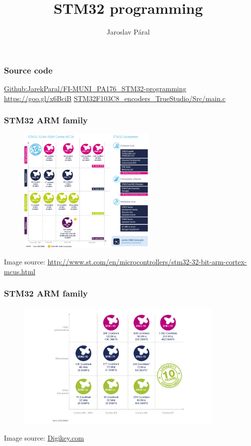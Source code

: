 \documentclass[12;pt,t]{beamer} %
\author{Jaroslav Páral}
\institute[paral.jarek@gmail.com]{FI MUNI: PA176\\[0.5cm]}
\title{STM32 programming}
\newcommand{\srctext}[1]{{\fontsize{7}{9}\selectfont\textcolor{sourcesclr}{#1}}}
\begin{document}
\frame{\titlepage}

\begin{frame}
\frametitle{Source code}
	\vfill
	\begin{center}
		 \href{https://github.com/JarekParal/FI-MUNI_PA176_STM32-programming}{Github:JarekParal/FI-MUNI\_PA176\_STM32-programming} \\
		 \vfill
		 \url{https://goo.gl/x6BciB}
		 \vfill
		 \href{https://github.com/JarekParal/FI-MUNI_PA176_STM32-programming/blob/master/STM32F103C8_encoders_TrueStudio/Src/main.c}{STM32F103C8\_encoders\_TrueStudio/Src/main.c}
	\end{center}
	
\end{frame}


\begin{frame}
\frametitle{STM32 ARM family}
	\begin{figure}[H]
		\includegraphics[width=0.6\textwidth]{img/stm32_cl1734.jpg}
	\end{figure}
	\srctext{Image source: \url{http://www.st.com/en/microcontrollers/stm32-32-bit-arm-cortex-mcus.html}}
\end{frame}

\begin{frame}
\frametitle{STM32 ARM family}
	\begin{figure}[H]
		\includegraphics[width=0.9\textwidth]{img/digikey_stm32-cortex.jpg}
	\end{figure}
	\srctext{Image source: \href{https://www.digikey.com/en/product-highlight/s/stmicroelectronics/stm32-overview}{Digikey.com}}
\end{frame}
\end{document}
